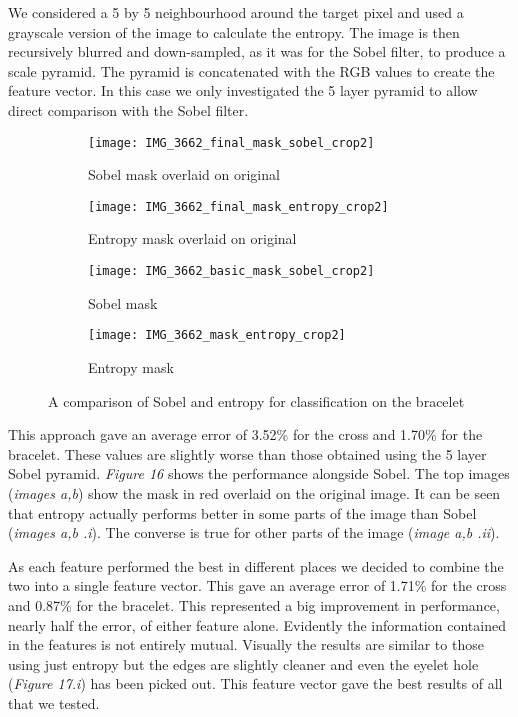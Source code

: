 \documentclass[12pt]{IIBproject}
\begin{document}
We considered a 5 by 5 neighbourhood around the target pixel and used a grayscale version of the image to calculate the entropy. The image is then recursively blurred and down-sampled, as it was for the Sobel filter, to produce a scale pyramid. The pyramid is concatenated with the RGB values to create the feature vector. In this case we only investigated the 5 layer pyramid to allow direct comparison with the Sobel filter. 
\begin{figure}[H]
\centering

\begin{subfigure}{.45\textwidth}
  \centering
  \texttt{[image: IMG\_3662\_final\_mask\_sobel\_crop2]}
  \caption{Sobel mask overlaid on original}
  \label{fig:sub1}
\end{subfigure}%
\begin{subfigure}{.45\textwidth}
  \centering
  \texttt{[image: IMG\_3662\_final\_mask\_entropy\_crop2]}
  \caption{Entropy mask overlaid on original}
  \label{fig:sub2}
\end{subfigure}
\begin{subfigure}{.45\textwidth}
  \centering
  \texttt{[image: IMG\_3662\_basic\_mask\_sobel\_crop2]}
  \caption{Sobel mask}
  \label{fig:sub2}
\end{subfigure}
\begin{subfigure}{.45\textwidth}
  \centering
  \texttt{[image: IMG\_3662\_mask\_entropy\_crop2]}
  \caption{Entropy mask}
  \label{fig:sub2}
\end{subfigure}


\caption{A comparison of Sobel and entropy for classification on the bracelet}
\label{fig:test}
\end{figure}
This approach gave an average error of 3.52\% for the cross and 1.70\% for the bracelet. These values are slightly worse than those obtained using the 5 layer Sobel pyramid. \emph{Figure 16} shows the performance alongside Sobel. The top images (\emph{images a,b}) show the mask in red overlaid on the original image. It can be seen that entropy actually performs better in some parts of the image than Sobel (\emph{images a,b .i}). The converse is true for other parts of the image (\emph{image a,b .ii}). 

As each feature performed the best in different places we decided to combine the two into a single feature vector. This gave an average error of 1.71\% for the cross and 0.87\% for the bracelet. This represented a big improvement in performance, nearly half the error, of either feature alone. Evidently the information contained in the features is not entirely mutual. Visually the results are similar to those using just entropy but the edges are slightly cleaner and even the eyelet hole (\emph{Figure 17.i}) has been picked out. This feature vector gave the best results of all that we tested.
\end{document}
